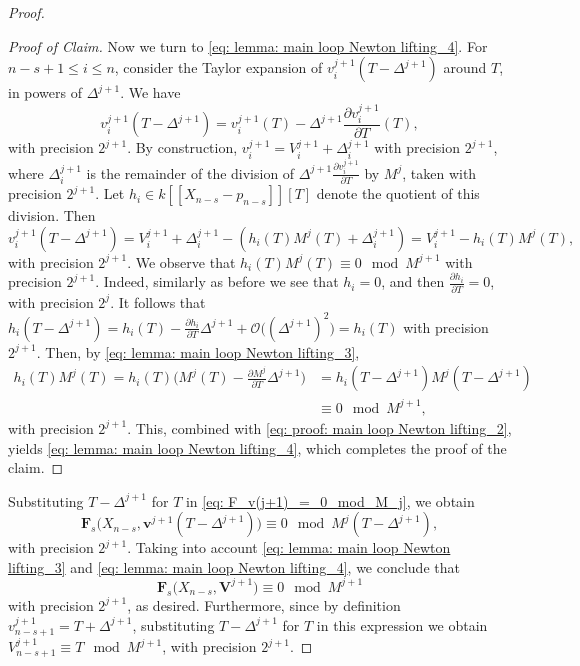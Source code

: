\documentclass[10pt,a4paper]{amsart}
\newcommand{\bfs}{\boldsymbol}
\begin{document}
\begin{proof}
\begin{proof}[Proof of Claim]
Now we turn to \eqref{eq: lemma: main loop Newton
lifting_4}. For $n-s+1\le i\le n$, consider the Taylor expansion of
$v^{j+1}_i(T-\Delta^{j+1})$ around $T$, in
powers of $\Delta^{j+1}$. We have
$$
v^{j+1}_i(T-\Delta^{j+1})=v^{j+1}_i(T)-\Delta^{j+1}\frac{\partial v^{j+1}_i}{\partial T}(T),
$$
with precision $2^{j+1}$. By construction,
$v^{j+1}_i=V^{j+1}_i+\Delta^{j+1}_i$ with precision $2^{j+1}$, where
$\Delta^{j+1}_{i}$ is the remainder of the division of
$\Delta^{j+1}\frac{\partial v^{j+1}_i}{\partial T}$ by $M^j$, taken
with precision $2^{j+1}$. Let $h_i\in k[\![X_{n-s}-p_{n-s}]\!][T]$
denote the quotient of this division. Then
%
\begin{equation}\label{eq: proof: main loop Newton lifting_2}v^{j+1}_i(T-\Delta^{j+1})=V_i^{j+1}+\Delta^{j+1}_i-(h_i(T)M^j(T)+\Delta_i^{j+1})
=V_i^{j+1}-h_i(T)M^j(T),
\end{equation}
%
with precision $2^{j+1}$. We observe that $h_i(T)M^j(T)\equiv 0\mod
M^{j+1}$ with precision $2^{j+1}$. Indeed, similarly as before we
see that $h_i=0$, and then $\frac{\partial h_i}{\partial T}=0$, with
precision $2^{j}$. It follows that $
h_i(T-\Delta^{j+1})=h_i(T)-\frac{\partial h_i}{\partial
T}\Delta^{j+1} + \mathcal{O}\big((\Delta^{j+1})^2\big)=h_i(T) $ with
precision $2^{j+1}$. Then, by \eqref{eq: lemma: main loop Newton
lifting_3},
%
\begin{align*}
h_i(T)M^j(T)=h_i(T)\Big(M^j(T)-\frac{\partial M^j}{\partial T}\Delta^{j+1}\Big)&=
h_i(T-\Delta^{j+1})M^j(T-\Delta^{j+1})\\&\equiv 0\mod M^{j+1},
\end{align*}
%
with precision $2^{j+1}$. This, combined with \eqref{eq: proof: main
loop Newton lifting_2}, yields \eqref{eq: lemma: main loop Newton
lifting_4}, which completes the proof of the claim.
\end{proof}

Substituting $T-\Delta^{j+1}$ for $T$ in
\eqref{eq: F_v(j+1)_=_0_mod_M_j}, we obtain
%
\begin{equation}\label{eq: F_v(j+1)_=_0_mod_M_j_1}
\bfs F_s\big(X_{n-s}, \bfs v^{j+1}(T-\Delta^{j+1})\big)\equiv 0 \mod M^{j}(T-\Delta^{j+1}),
\end{equation}
%
with precision $2^{j+1}$. Taking into account \eqref{eq: lemma: main
loop Newton lifting_3} and \eqref{eq: lemma: main loop Newton
lifting_4}, we conclude that $$\bfs F_s\big(X_{n-s}, \bfs V^{j+1}
\big) \equiv 0 \mod M^{j+1}$$ with precision $2^{j+1}$, as desired.
Furthermore, since by definition $v^{j+1}_{n-s+1}=T+\Delta^{j+1}$,
substituting $T-\Delta^{j+1}$ for $T$ in this expression we obtain
$V^{j+1}_{n-s+1}\equiv T \mod M^{j+1}$, with precision $2^{j+1}$.


\end{proof}
\end{document}
